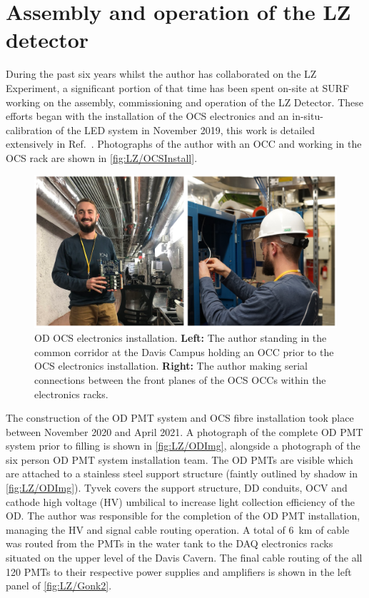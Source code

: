 \section{Assembly and operation of the LZ detector}\label{sec:LZ/LZAssembly}
During the past six years whilst the author has collaborated on the LZ Experiment, a significant portion of that time has been spent on-site at SURF working on the assembly, commissioning and operation of the LZ Detector. These efforts began with the installation of the OCS electronics and an in-situ-calibration of the LED system in November 2019, this work is detailed extensively in Ref.~\cite{hbirch:thesis}. Photographs of the author with an OCC and working in the OCS rack are shown in \autoref{fig:LZ/OCSInstall}.

\begin{figure}[ht!]
    \centering
    \includegraphics[width=0.9\linewidth]{figures/LZ/OCSInstall_2panel.png}
    \caption[OD OCS electronics installation.]{OD OCS electronics installation. \textbf{Left:} The author standing in the common corridor at the Davis Campus holding an OCC prior to the OCS electronics installation. \textbf{Right:} The author making serial connections between the front planes of the OCS OCCs within the electronics racks.}
    \label{fig:LZ/OCSInstall}
\end{figure}

The construction of the OD PMT system and OCS fibre installation took place between November 2020 and April 2021. A photograph of the complete OD PMT system prior to filling is shown in \autoref{fig:LZ/ODImg}, alongside a photograph of the six person OD PMT system installation team. The OD PMTs are visible which are attached to a stainless steel support structure (faintly outlined by shadow in \autoref{fig:LZ/ODImg}). Tyvek covers the support structure, DD conduits, OCV and cathode high voltage (HV) umbilical to increase light collection efficiency of the OD. The author was responsible for the completion of the OD PMT installation, managing the HV and signal cable routing operation. A total of 6~km of cable was routed from the PMTs in the water tank to the DAQ electronics racks situated on the upper level of the Davis Cavern. The final cable routing of the all 120 PMTs to their respective power supplies and amplifiers is shown in the left panel of \autoref{fig:LZ/Gonk2}.

